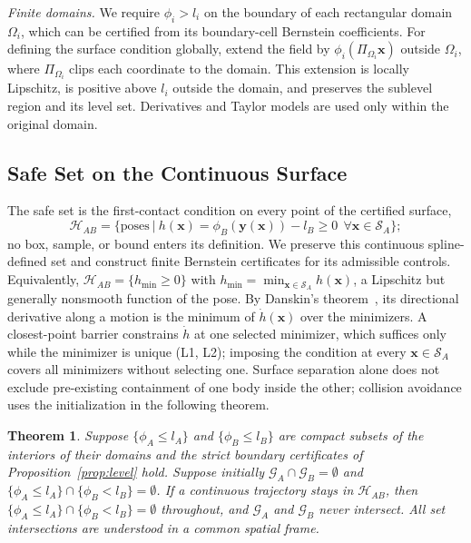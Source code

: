 \documentclass[journal]{IEEEtran}
\newtheorem{theorem}{Theorem}
\theoremstyle{definition}
\begin{document}
\emph{Finite domains.} We require $\phi_i>l_i$ on the boundary of each rectangular domain
$\Omega_i$, which can be certified from its boundary-cell Bernstein coefficients. For defining
the surface condition globally, extend the field by $\phi_i(\Pi_{\Omega_i}\mathbf x)$ outside
$\Omega_i$, where $\Pi_{\Omega_i}$ clips each coordinate to the domain. This extension is locally
Lipschitz, is positive above $l_i$ outside the domain, and preserves the sublevel region and its
level set. Derivatives and Taylor models are used only within the original domain.

\subsection{Safe Set on the Continuous Surface}
The safe set is the first-contact condition on every point of the certified surface,
\begin{equation}\label{eq:safe}
\mathcal H_{AB}=\big\{\text{poses}\ \big|\ h(\mathbf x)=\phi_B(\mathbf y(\mathbf x))-l_B\ge0\ \ \forall\mathbf x\in\mathcal S_A\big\};
\end{equation}
no box, sample, or bound enters its definition. We preserve this continuous spline-defined set
and construct finite Bernstein certificates for its admissible controls. Equivalently,
$\mathcal H_{AB}=\{h_{\min}\ge0\}$ with $h_{\min}=\min_{\mathbf x\in\mathcal S_A}h(\mathbf x)$, a
Lipschitz but generally nonsmooth function of the pose. By Danskin's theorem~\cite{danskin1966theory},
its directional derivative along a motion is the minimum of $\dot h(\mathbf x)$ over the minimizers.
A closest-point barrier constrains $\dot h$ at one selected minimizer, which suffices only while
the minimizer is unique (L1, L2); imposing the condition at every $\mathbf x\in\mathcal S_A$ covers
all minimizers without selecting one. Surface separation alone
does not exclude pre-existing containment of one body inside the other; collision avoidance uses
the initialization in the following theorem.
\begin{theorem}\label{thm:cover}
Suppose $\{\phi_A\le l_A\}$ and $\{\phi_B\le l_B\}$ are compact subsets of the interiors of their domains and
the strict boundary certificates of Proposition~\ref{prop:level} hold. Suppose initially
$\mathcal G_A\cap\mathcal G_B=\emptyset$ and
$\{\phi_A\le l_A\}\cap\{\phi_B<l_B\}=\emptyset$.
If a continuous trajectory stays in $\mathcal H_{AB}$, then
$\{\phi_A\le l_A\}\cap\{\phi_B<l_B\}=\emptyset$ throughout, and $\mathcal G_A$ and $\mathcal G_B$
never intersect. All set intersections are understood in a common spatial frame.
\end{theorem}
\end{document}
